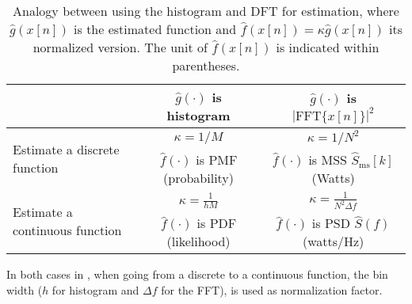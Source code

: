 \begin{table}
\centering
\caption{Analogy between using the histogram and DFT for estimation, where $\hat g(x[n])$ is the estimated function and $\hat f(x[n]) =\kappa \hat g(x[n])$ its normalized version. The unit of $\hat f(x[n])$ is indicated within parentheses.\label{tab:analogy_psd_pdf}}
\begin{tabular}{|l|c||c|}
\hline
& $\hat g(\cdot)$ is histogram  & $\hat g(\cdot)$ is $|\textrm{FFT}\{x[n]\}|^2$ \\ \hline
\multirow{2}{*}{\parbox{3cm}{Estimate a discrete function}}  & $\kappa=1/M$ & $\kappa=1/N^2$ \\ \cline{2-3}
 & $\hat f(\cdot)$ is PMF (probability) & $\hat f(\cdot)$ is MSS $\hat S_{\textrm{ms}}[k]$ (Watts) \\ \hline \hline
\multirow{2}{*}{\parbox{3cm}{Estimate a continuous function}}  & $\kappa= \frac{1}{hM}$ & $\kappa= \frac{1}{N^2 \Delta f}$ \\  \cline{2-3}
& $\hat f(\cdot)$ is PDF (likelihood) & $\hat f(\cdot)$ is PSD $\hat S(f)$ (watts/Hz) \\ \hline
\end{tabular}
\end{table}

In both cases in , when going from a discrete to a continuous function, the bin width ($h$ for histogram and $\Delta f$ for the FFT), is used as normalization factor.


